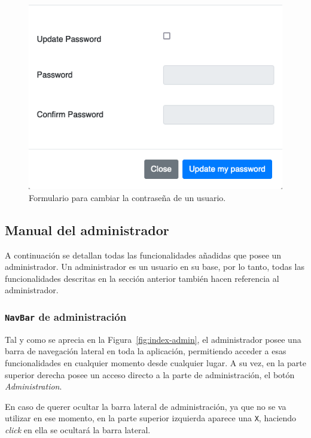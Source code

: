 \begin{figure}
\centering
\includegraphics[scale=0.5]{../img/anexos/manual-usuario/UBUMLaaS/edit-profile-passwd}
\caption{Formulario para cambiar la contraseña de un usuario.}\label{fig:edit-profile-passwd}
\end{figure}

\FloatBarrier
\subsection{Manual del administrador}
A continuación se detallan todas las funcionalidades añadidas que posee un administrador. Un administrador es un usuario en su base, por lo tanto, todas las funcionalidades descritas en la sección anterior también hacen referencia al administrador.

\subsubsection{\texttt{NavBar} de administración}
Tal y como se aprecia en la Figura~\ref{fig:index-admin}, el administrador posee una barra de navegación lateral en toda la aplicación, permitiendo acceder a esas funcionalidades en cualquier momento desde cualquier lugar. A su vez, en la parte superior derecha posee un acceso directo a la parte de administración, el botón \textit{Administration}.

En caso de querer ocultar la barra lateral de administración, ya que no se va utilizar en ese momento, en la parte superior izquierda aparece una \texttt{X}, haciendo \textit{click} en ella se ocultará la barra lateral.

